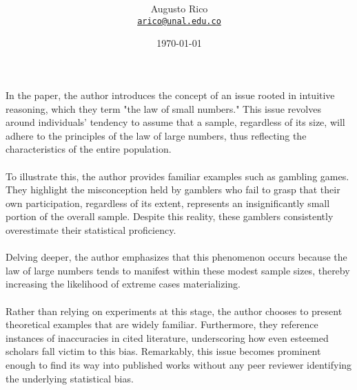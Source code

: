 \documentclass[11pt]{article}
\title{\text{First Assignment}
}
\author{Augusto Rico\\%
    \href{mailto:arico@unal.edu.co}{\texttt{arico@unal.edu.co}}
    }
\date{\today}
\begin{document}
\maketitle


\begin{flushleft}
    In the paper, the author introduces the concept of an issue rooted in intuitive reasoning, which they term "the law of small numbers." This issue revolves around individuals' tendency to assume that a sample, regardless of its size, will adhere to the principles of the law of large numbers, thus reflecting the characteristics of the entire population.\\~\\

    To illustrate this, the author provides familiar examples such as gambling games. They highlight the misconception held by gamblers who fail to grasp that their own participation, regardless of its extent, represents an insignificantly small portion of the overall sample. Despite this reality, these gamblers consistently overestimate their statistical proficiency.\\~\\
    
    Delving deeper, the author emphasizes that this phenomenon occurs because the law of large numbers tends to manifest within these modest sample sizes, thereby increasing the likelihood of extreme cases materializing.\\~\\
    
    Rather than relying on experiments at this stage, the author chooses to present theoretical examples that are widely familiar. Furthermore, they reference instances of inaccuracies in cited literature, underscoring how even esteemed scholars fall victim to this bias. Remarkably, this issue becomes prominent enough to find its way into published works without any peer reviewer identifying the underlying statistical bias.\\~\\
    

\end{flushleft}
\end{document}
